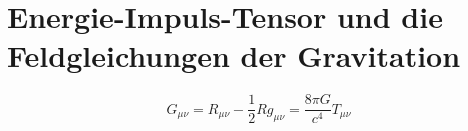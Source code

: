 %
%
\section{Energie-Impuls-Tensor und die Feldgleichungen der Gravitation
\label{buch:kruemmung:section:gravitation}}

\begin{equation}
G_{\mu\nu}
=
R_{\mu\nu}
-
\frac12 Rg_{\mu\nu}
=
\frac{8\pi G}{c^4}T_{\mu\nu}
\label{buch:kruemmung:feldgleichung:eqn:feldgleichung}
\end{equation}
